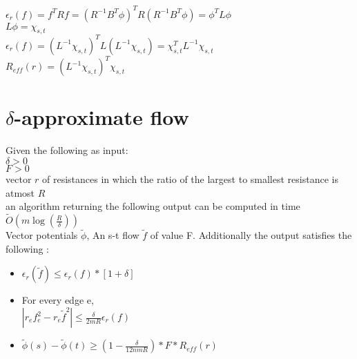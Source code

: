 \documentclass[a4paper,10pt]{article}
\newcommand{\eps}{\epsilon}
\begin{document}
	$\eps_r(f) = f^TRf = (R^{-1}B^T\phi)^T R (R^{-1} B^T \phi) = \phi^T L \phi$ \\
	
	$L \phi = \chi_{s,t}$ \\
	
	$\eps_r(f) = (L^{-1}\chi_{s,t})^T L (L^{-1} \chi_{s,t}) = \chi_{s,t}^T L^{-1} \chi_{s,t}$ \\
	
	$R_{eff}(r) = (L^{-1}\chi_{s,t})^T \chi_{s,t}$
	
      \section{$\delta$-approximate flow}
	Given the following as input: \\
	$\delta>0$ \\
	$F>0$ \\
	vector $r$ of resistances in which the ratio of the largest to smallest resistance is atmost $R$ \\
	
	an algorithm returning the following output can be computed in time $\widetilde{O}(m \log(\frac{R}{\delta}))$ \\
	
	Vector potentials $\widetilde{\phi}$, An s-t flow $\widetilde{f}$ of value F. Additionally the output satisfies the following : 
	\begin{itemize}
	 \item 
	  $\eps_r(\widetilde{f}) \leq \eps_r(f)\ast [1+\delta]$
	 \item
	  For every edge e, \\
	  
	  $|r_ef_e^2 - r_e\widetilde{f}^2| \leq \frac{\delta}{2mR}\eps_r(f)$
	 \item
	  $\widetilde{\phi}(s)-\widetilde{\phi}(t) \geq (1-\frac{\delta}{12nmR})\ast F \ast R_{eff}(r)$
	\end{itemize}

	
	
      
	
	   
	    
	    
	
	
      
 
  
  
   
\end{document}
